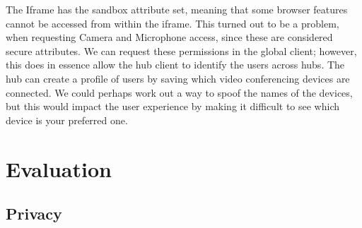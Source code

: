 \documentclass{report}
\begin{document}
The Iframe has the sandbox attribute set, meaning that some browser features cannot be accessed from within the
iframe. This turned out to be a problem, when requesting Camera and Microphone access, since these are considered
secure attributes. We can request these permissions in the global client; however, this does in essence allow the
hub client to identify the users across hubs. The hub can create a profile of users by saving which video
conferencing devices are connected. We could perhaps work out a way to spoof the names of the devices, but this
would impact the user experience by making it difficult to see which device is your preferred one.

\chapter{Evaluation}
\section{Privacy}





\end{document}
